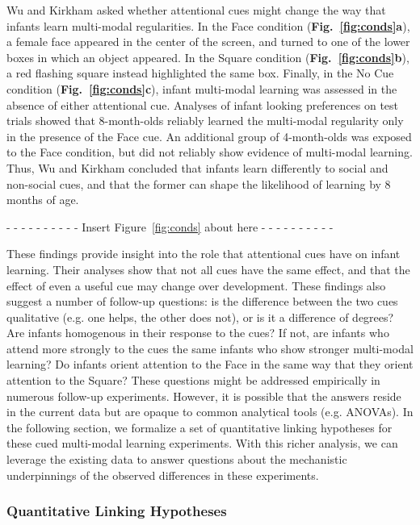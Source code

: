\documentclass[12pt]{article}
\begin{document}
	Wu and Kirkham \cite{Wu2010a} asked whether attentional cues might change the way that infants learn multi-modal regularities. In the Face condition (\textbf{Fig.~\ref{fig:conds}a}), a female face appeared in the center of the screen, and turned to one of the lower boxes in which an object appeared. In the Square condition (\textbf{Fig.~\ref{fig:conds}b}), a red flashing square instead highlighted the same box. Finally, in the No Cue condition (\textbf{Fig.~\ref{fig:conds}c}), infant multi-modal learning was assessed in the absence of either attentional cue. Analyses of infant looking preferences on test trials showed that 8-month-olds reliably learned the multi-modal regularity only in the presence of the Face cue. An additional group of 4-month-olds was exposed to the Face condition, but did not reliably show evidence of multi-modal learning. Thus, Wu and Kirkham \cite{Wu2010a} concluded that infants learn differently to social and non-social cues, and that the former can shape the likelihood of learning by 8 months of age.

\begin{center}- - - - - - - - - - Insert Figure~\ref{fig:conds} about here - - - - - - - - - -\end{center}
	
	These findings provide insight into the role that attentional cues have on infant learning. Their analyses show that not all cues have the same effect, and that the effect of even a useful cue may change over development. These findings also suggest a number of follow-up questions: is the difference between the two cues qualitative (e.g. one helps, the other does not), or is it a difference of degrees? Are infants homogenous in their response to the cues? If not, are infants who attend more strongly to the cues the same infants who show stronger multi-modal learning? Do infants orient attention to the Face in the same way that they orient attention to the Square? These questions might be addressed empirically in numerous follow-up experiments. However, it is possible that the answers reside in the current data but are opaque to common analytical tools (e.g. ANOVAs). In the following section, we formalize a set of quantitative linking hypotheses for these cued multi-modal learning experiments. With this richer analysis, we can leverage the existing data to answer questions about the mechanistic underpinnings of the observed differences in these experiments.

\subsubsection*{Quantitative Linking Hypotheses}
\end{document}
